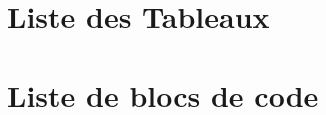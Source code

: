 \documentclass[a4paper,11pt,fleqn]{book}
\begin{document}
\chapter{Liste des Tableaux}
\listoftables


\cleardoublepage
{}
\chapter{Liste de blocs de code}
\listofcode


\appendix




\backmatter
\end{document}
